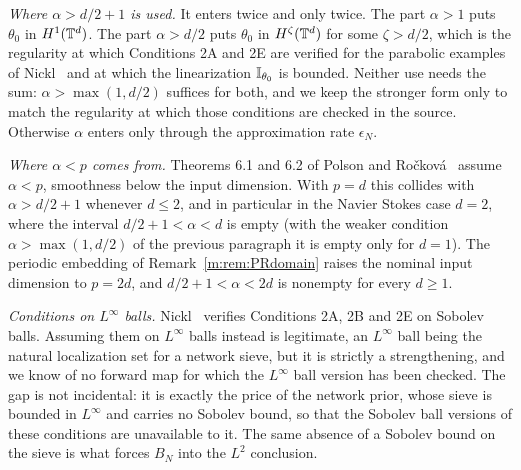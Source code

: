 \begin{remark}\label{m:rem:PRhyp}
\emph{Where $\alpha>d/2+1$ is used.} It enters twice and only twice. The part $\alpha>1$ puts $\theta_0$ in $H^1(\mathbb{T}^d)$. The part $\alpha>d/2$ puts $\theta_0$ in $H^\zeta(\mathbb{T}^d)$ for some $\zeta>d/2$, which is the regularity at which Conditions 2A and 2E are verified for the parabolic examples of Nickl~\cite{nicklbvm2024} and at which the linearization $\mathbb{I}_{\theta_0}$ is bounded. Neither use needs the sum: $\alpha>\max(1,d/2)$ suffices for both, and we keep the stronger form only to match the regularity at which those conditions are checked in the source. Otherwise $\alpha$ enters only through the approximation rate $\epsilon_N$.

\emph{Where $\alpha<p$ comes from.} Theorems 6.1 and 6.2 of Polson and Ro\v{c}kov\'a~\cite{polsonrockova2018} assume $\alpha<p$, smoothness below the input dimension. With $p=d$ this collides with $\alpha>d/2+1$ whenever $d\le2$, and in particular in the Navier Stokes case $d=2$, where the interval $d/2+1<\alpha<d$ is empty (with the weaker condition $\alpha>\max(1,d/2)$ of the previous paragraph it is empty only for $d=1$). The periodic embedding of Remark~\ref{m:rem:PRdomain} raises the nominal input dimension to $p=2d$, and $d/2+1<\alpha<2d$ is nonempty for every $d\ge1$.

\emph{Conditions on $L^\infty$ balls.} Nickl~\cite{nicklbvm2024} verifies Conditions 2A, 2B and 2E on Sobolev balls. Assuming them on $L^\infty$ balls instead is legitimate, an $L^\infty$ ball being the natural localization set for a network sieve, but it is strictly a strengthening, and we know of no forward map for which the $L^\infty$ ball version has been checked. The gap is not incidental: it is exactly the price of the network prior, whose sieve is bounded in $L^\infty$ and carries no Sobolev bound, so that the Sobolev ball versions of these conditions are unavailable to it. The same absence of a Sobolev bound on the sieve is what forces $B_N$ into the $L^2$ conclusion.
\end{remark}

